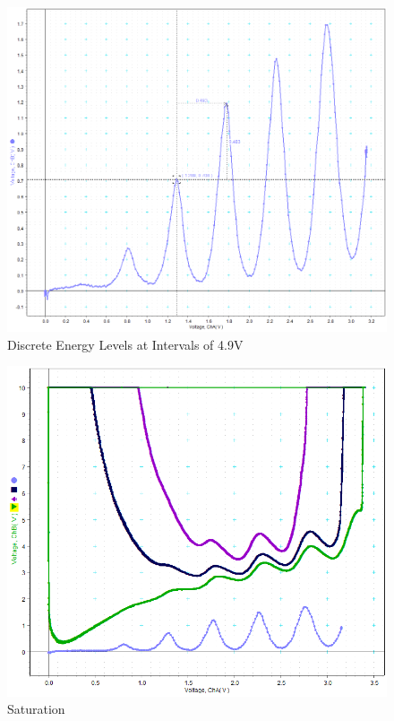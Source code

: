 \documentclass{amsart}
\begin{document}
\begin{figure}[H]
\includegraphics[height=0.42790985\textheight]{graph.png}
\caption{Discrete Energy Levels at Intervals of 4.9V}
\end{figure}

\begin{figure}[H]
\includegraphics[height=0.42790985\textheight]{saturation.png}
\caption{Saturation}
\end{figure}
\end{document}
